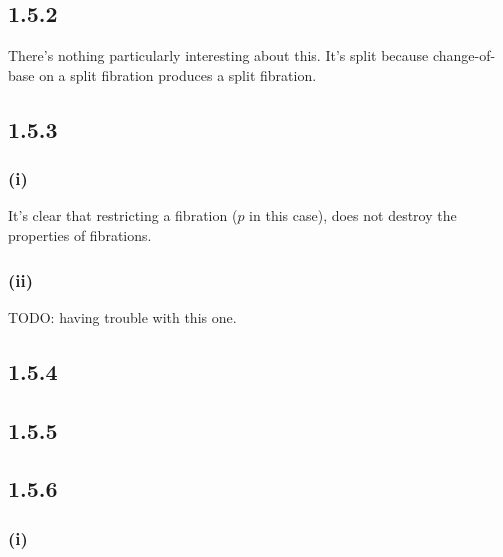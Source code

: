 \documentclass{article}
\newcommand{\mbf}{\mathbf}
\begin{document}
\subsection*{1.5.2}


There's nothing particularly interesting about this. It's split because change-of-base on a split
fibration produces a split fibration. 

\subsection*{1.5.3}

\subsubsection*{(i)}

It's clear that restricting a fibration ($p$ in this case), does not destroy the properties of fibrations.

\subsubsection*{(ii)}

TODO: having trouble with this one.

\subsection*{1.5.4}
\subsection*{1.5.5}

\subsection*{1.5.6}

\subsubsection*{(i)}
\end{document}
